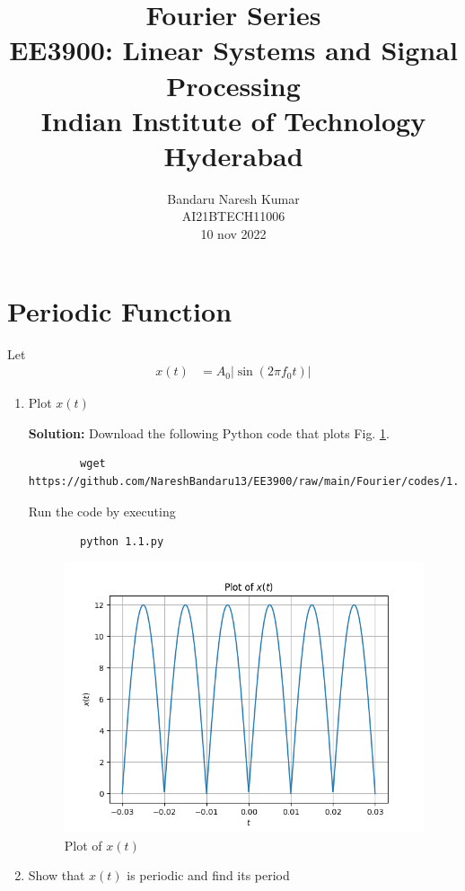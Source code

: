 \documentclass[journal,12pt,twocolumn]{IEEEtran}
\title{Fourier Series \\ \Large EE3900: Linear Systems and Signal Processing \\ \large Indian Institute of Technology Hyderabad}
\author{Bandaru Naresh Kumar \\ \normalsize AI21BTECH11006 \\ \vspace*{20pt} \normalsize 10 nov 2022}
\newcommand{\solution}{\noindent \textbf{Solution: }}
\providecommand{\brak}[1]{\ensuremath{\left(#1\right)}}
\providecommand{\abs}[1]{\left\vert#1\right\vert}
\numberwithin{equation}{section}
\numberwithin{figure}{section}
\renewcommand\thesection{\arabic{section}}
\begin{document}
	\maketitle

	\section{Periodic Function}
	Let 
	\begin{align}
		x(t) &= A_0\abs{\sin\brak{2\pi f_0 t}}
		\label{eq:10-orig-diff-def}
	\end{align}

	\begin{enumerate}[label=\thesection.\arabic*,ref=\thesection.\theenumi]
	\item Plot $x(t)$
	
	\solution Download the following Python code that plots Fig. \ref{fig-1.1}.
	\begin{lstlisting}
		wget https://github.com/NareshBandaru13/EE3900/raw/main/Fourier/codes/1.1.py
	\end{lstlisting}
	
	Run the code by executing
	\begin{lstlisting}
		python 1.1.py
	\end{lstlisting}

	\begin{figure}[!ht]
		\centering
		\includegraphics[width=\columnwidth]{./figs/1.1.png}
		\caption{Plot of $x(t)$}
		\label{fig-1.1}	
	\end{figure}
	
	\item Show that $x(t)$ is periodic and find its period
	

\end{enumerate}
\end{document}
